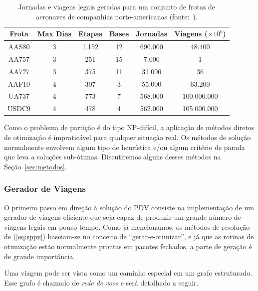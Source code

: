 \documentclass[12pt,a4paper]{article}
\begin{document}
\begin{table}[ht]
	\begin{center}
		\begin{tabular}{|c||c|c|c|c|c|}
			\hline
			{\bf Frota} & {\bf Max Dias} & {\bf Etapas} & {\bf Bases} & {\bf Jornadas} & 
			{\bf Viagens} ($\times 10^6$) \\
			\hline
			AAS80 & 3 & 1.152 & 12 & 690.000 & 48.400 \\
			\hline
			AA757 & 3 & 251 & 15 & 7.000 & 1 \\
			\hline
			AA727 & 3 & 375 & 11 & 31.000 & 36 \\
			\hline
			AAF10 & 4 & 307 & 3 & 55.000 & 63.200 \\
			\hline 
			UA737 & 4 & 773 & 7 & 568.000 & 100.000.000 \\
			\hline
			USDC9 & 4 & 478 & 4 & 562.000 & 105.000.000 \\
			\hline
		\end{tabular}
		\caption{Jornadas e viagens legais geradas para um conjunto de frotas de aeronaves de companhias
		norte-americanas (fonte:~\cite{anbil98}).}
		\label{tab:viagens}
	\end{center}
\end{table}

Como o problema de partição é do tipo NP-difícil, a aplicação de métodos diretos de 
otimização é impraticável para qualquer situação real. Os métodos de solução normalmente envolvem
algum tipo de heurística e/ou algum critério de parada que leva a soluções sub-ótimas. Discutiremos
alguns desses métodos na Seção~\ref{sec:metodos}. 

\subsubsection{Gerador de Viagens}
\label{sec:gerador_viagens}

O primeiro passo em direção à solução do PDV consiste na implementação de um gerador de viagens 
eficiente que seja capaz de produzir um grande número de viagens legais em pouco tempo. Como já
mencionamos, os métodos de resolução de (\ref{eq:sppv}) baseiam-se no conceito de 
``gerar-e-otimizar'', e já que as rotinas de otimização estão normalmente prontas em pacotes 
fechados, a parte de geração é de grande importância.

Uma viagem pode ser vista como um caminho especial em um grafo estruturado. Esse grafo é chamado de
\emph{rede de voos} e será detalhado a seguir. 
\end{document}
